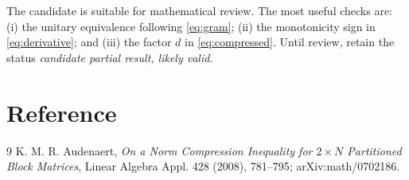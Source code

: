 \documentclass[11pt]{article}
\begin{document}
The candidate is suitable for mathematical review.  The most useful checks
are: (i) the unitary equivalence following \eqref{eq:gram}; (ii) the
monotonicity sign in \eqref{eq:derivative}; and (iii) the factor $d$ in
\eqref{eq:compressed}.  Until review, retain the status
\emph{candidate partial result, likely valid}.

\section{Reference}

\begin{thebibliography}{9}
K. M. R. Audenaert,
\emph{On a Norm Compression Inequality for $2\times N$ Partitioned Block
Matrices}, Linear Algebra Appl. 428 (2008), 781--795;
arXiv:math/0702186.
\end{thebibliography}
\end{document}
